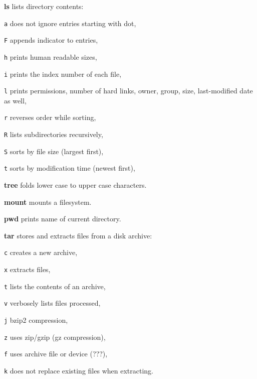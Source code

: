 \begin{enumx}
	\item [\cmdblack] \textbf{ls} lists directory contents:
	\item [\texttt{a}] does not ignore entries starting with dot, 
	\item [\texttt{F}] appends indicator to entries, 
	\item [\texttt{h}] prints human readable sizes, 
	\item [\texttt{i}] prints the index number of each file, 
	\item [\texttt{l}] prints permissions, number of hard links, owner, group, size, last-modified date as well, 
	\item [\texttt{r}] reverses order while sorting,
	\item [\texttt{R}] lists subdirectories recursively, 
	\item [\texttt{S}] sorts by file size (largest first), 
	\item [\texttt{t}] sorts by modification time (newest first), 
	\item [\cmd] \textbf{tree} folds lower case to upper case characters.
\end{enumx}

\begin{enumx}
	\item [\cmd] \textbf{mount} mounts a filesystem.
\end{enumx}

\begin{enumx}
	\item [\cmdblack] \textbf{pwd} prints name of current directory.
\end{enumx}

\begin{enumx}
	\item [\cmd] \textbf{tar} stores and extracts files from a disk archive:
	\item [\texttt{c}] creates a new archive,
	\item [\texttt{x}] extracts files,
	\item [\texttt{t}] lists the contents of an archive,
	\item [\texttt{v}] verbosely lists files processed,
	\item [\texttt{j}] bzip2 compression,
	\item [\texttt{z}] uses zip/gzip (gz compression),
	\item [\texttt{f}] uses archive file or device (???),
	\item [\texttt{k}] does not replace existing files when extracting.
\end{enumx}

